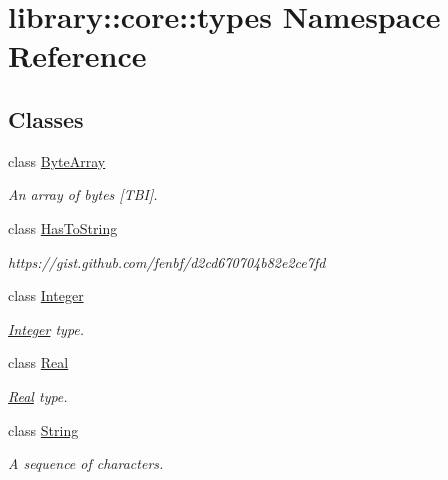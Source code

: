 \hypertarget{namespacelibrary_1_1core_1_1types}{}\section{library\+:\+:core\+:\+:types Namespace Reference}
\label{namespacelibrary_1_1core_1_1types}
\subsection*{Classes}
\begin{DoxyCompactItemize}
\item 
class \hyperlink{classlibrary_1_1core_1_1types_1_1_byte_array}{Byte\+Array}
\begin{DoxyCompactList}\small\item\em An array of bytes \mbox{[}T\+BI\mbox{]}. \end{DoxyCompactList}\item 
class \hyperlink{classlibrary_1_1core_1_1types_1_1_has_to_string}{Has\+To\+String}
\begin{DoxyCompactList}\small\item\em https\+://gist.github.\+com/fenbf/d2cd670704b82e2ce7fd \end{DoxyCompactList}\item 
class \hyperlink{classlibrary_1_1core_1_1types_1_1_integer}{Integer}
\begin{DoxyCompactList}\small\item\em \hyperlink{classlibrary_1_1core_1_1types_1_1_integer}{Integer} type. \end{DoxyCompactList}\item 
class \hyperlink{classlibrary_1_1core_1_1types_1_1_real}{Real}
\begin{DoxyCompactList}\small\item\em \hyperlink{classlibrary_1_1core_1_1types_1_1_real}{Real} type. \end{DoxyCompactList}\item 
class \hyperlink{classlibrary_1_1core_1_1types_1_1_string}{String}
\begin{DoxyCompactList}\small\item\em A sequence of characters. \end{DoxyCompactList}\end{DoxyCompactItemize}

